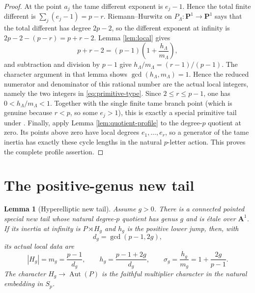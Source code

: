 \documentclass[11pt]{amsart}
\theoremstyle{plain}
\newtheorem{lemma}[theorem]{Lemma}
\theoremstyle{definition}
\numberwithin{equation}{section}
\begin{document}
\begin{proof}
At the point $a_j$ the tame different exponent is $e_j-1$.  Hence the total
finite different is
$\sum_j(e_j-1)=p-r$.  Riemann--Hurwitz on
$P_\Lambda:\mathbf P^1\to\mathbf P^1$ says that the total different has
degree $2p-2$, so the different exponent at infinity is
$2p-2-(p-r)=p+r-2$.  Lemma \ref{lem:local} gives
\[
 p+r-2=(p-1)\left(1+\frac{h_\Lambda}{m_\Lambda}\right),
\]
and subtraction and division by $p-1$ give
$h_\Lambda/m_\Lambda=(r-1)/(p-1)$.  The character argument in that lemma
shows
$\gcd(h_\Lambda,m_\Lambda)=1$.  Hence the reduced numerator and denominator
of this rational number are the actual local integers, namely the two
integers in \eqref{eq:primitive-type}.  Since
$2\leq r\leq p-1$, one has
$0<h_\Lambda/m_\Lambda<1$.  Together with the single finite tame branch
point (which is genuine because $r<p$, so some $e_j>1$), this is exactly a
special primitive tail under
\cite[Definitions 2.9--2.10]{WewersThree}.  Finally, apply Lemma
\ref{lem:quotient-profile} to the degree-$p$ quotient at zero.  Its points
above zero have local degrees $e_1,\ldots,e_r$, so a generator of the tame
inertia has exactly these cycle lengths in the natural $p$-letter action.
This proves the complete profile assertion.
\end{proof}

\section{The positive-genus new tail}

\begin{lemma}[Hyperelliptic new tail]\label{lem:newtail}
Assume $g>0$.  There is a connected pointed special new tail whose natural
degree-$p$ quotient has genus $g$ and is étale over $\mathbf A^1$.  If its
inertia at infinity is
$P\rtimes H_g$ and $h_g$ is the positive lower jump, then, with
\[
 d_g=\gcd(p-1,2g),
\]
its actual local data are
\[
 |H_g|=m_g=\frac{p-1}{d_g},\qquad
 h_g=\frac{p-1+2g}{d_g},\qquad
 \sigma_g=\frac{h_g}{m_g}=1+\frac{2g}{p-1}.
 \label{eq:new-type}
\]
The character $H_g\to\operatorname{Aut}(P)$ is the faithful multiplier
character in the natural embedding in $S_p$.
\end{lemma}
\end{document}
